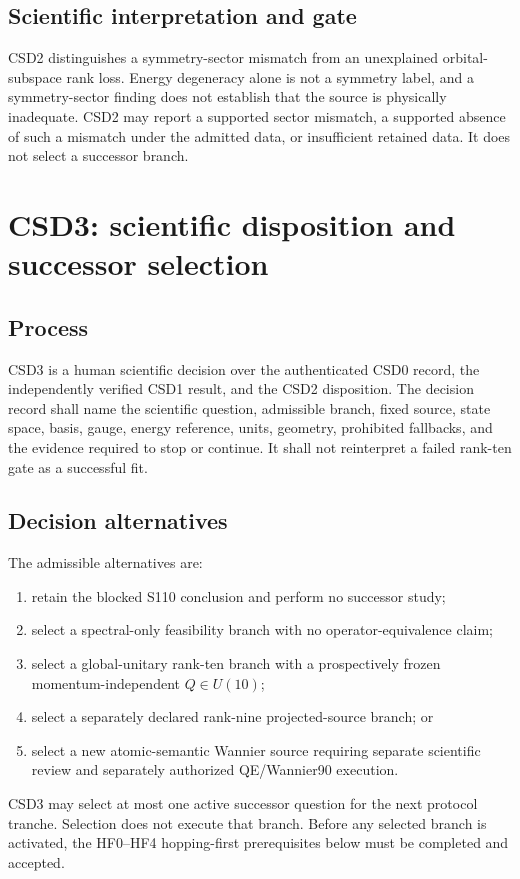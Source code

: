 \documentclass[11pt]{report}
\begin{document}
\section{Scientific interpretation and gate}

CSD2 distinguishes a symmetry-sector mismatch from an unexplained orbital-subspace
rank loss.  Energy degeneracy alone is not a symmetry label, and a symmetry-sector
finding does not establish that the source is physically inadequate.  CSD2 may report a
supported sector mismatch, a supported absence of such a mismatch under the admitted
data, or insufficient retained data.  It does not select a successor branch.

\chapter{CSD3: scientific disposition and successor selection}

\section{Process}

CSD3 is a human scientific decision over the authenticated CSD0 record, the independently
verified CSD1 result, and the CSD2 disposition.  The decision record shall name the
scientific question, admissible branch, fixed source, state space, basis, gauge, energy
reference, units, geometry, prohibited fallbacks, and the evidence required to stop or
continue.  It shall not reinterpret a failed rank-ten gate as a successful fit.

\section{Decision alternatives}

The admissible alternatives are:
\begin{enumerate}
 \item retain the blocked S110 conclusion and perform no successor study;
 \item select a spectral-only feasibility branch with no operator-equivalence claim;
 \item select a global-unitary rank-ten branch with a prospectively frozen
   momentum-independent $Q\in U(10)$;
 \item select a separately declared rank-nine projected-source branch; or
 \item select a new atomic-semantic Wannier source requiring separate scientific review
   and separately authorized QE/Wannier90 execution.
\end{enumerate}
CSD3 may select at most one active successor question for the next protocol tranche.
Selection does not execute that branch.  Before any selected branch is activated, the
HF0--HF4 hopping-first prerequisites below must be completed and accepted.
\end{document}
